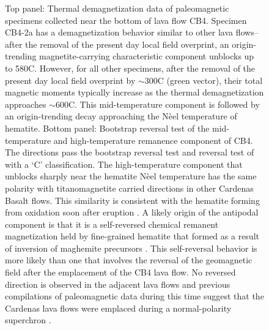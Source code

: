 \begin{figure}
\caption[Paleomagnetic data of Cardenas Basalt lava flow site CB4]{\footnotesize Top panel: Thermal demagnetization data of paleomagnetic specimens collected near the bottom of lava flow CB4. Specimen CB4-2a has a demagnetization behavior similar to other lava flows--after the removal of the present day local field overprint, an origin-trending magnetite-carrying characteristic component unblocks up to 580\textdegree C. However, for all other specimens, after the removal of the present day local field overprint by $\sim$300\textdegree C (green vector), their total magnetic moments typically increase as the thermal demagnetization approaches $\sim$600\textdegree C. This mid-temperature component is followed by an origin-trending decay approaching the N\`eel temperature of hematite. Bottom panel: Bootstrap reversal test \citep{Tauxe1991a} of the mid-temperature and high-temperature remanence component of CB4. The directions pass the bootstrap reversal test and \cite{McFadden1990a} reversal test of  with a `C' classification. The high-temperature component that unblocks sharply near the hematite N\`eel temperature has the same polarity with titanomagnetite carried directions in other Cardenas Basalt flows. This similarity is consistent with the hematite forming from oxidation soon after eruption \citep{Haggerty1967a}. A likely origin of the antipodal component is that it is a self-reversed chemical remanent magnetization held by fine-grained hematite that formed as a result of inversion of maghemite precursors \citep{Hedley1968a, McClelland1987a, McClelland1993a, Swanson-Hysell2011a}. This self-reversal behavior is more likely than one that involves the reversal of the geomagnetic field after the emplacement of the CB4 lava flow. No reversed direction is observed in the adjacent lava flows and previous compilations of paleomagnetic data during this time suggest that the Cardenas lava flows were emplaced during a normal-polarity superchron \citep{Swanson-Hysell2019a, Driscoll2016b}.}
\label{fig:CB4_reversal_test}
\end{figure}

